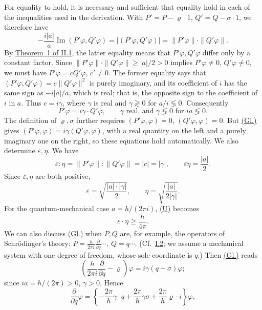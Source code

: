 \documentclass[fontsize=13pt,twoside,openany,headings=normal,parskip=false,bookmarkpackage=false,DIV=calc]{scrbook}
\begin{document}
For equality to hold, it is necessary and sufficient that equality hold in each of the inequalities used in the derivation. With $P'=P-\varrho\cdot1$, $Q'=Q-\sigma\cdot1$, we therefore have
\[
-\frac{i|a|}a\operatorname{Im}(P'\varphi,Q'\varphi)
=|(P'\varphi,Q'\varphi)|=\|P'\varphi\|\cdot\|Q'\varphi\|.
\]
By \hyperref[thm:II.1]{Theorem~1 of II.1}, the latter equality means that $P'\varphi,Q'\varphi$ differ only by a constant factor. Since $\|P'\varphi\|\cdot\|Q'\varphi\|\ge|a|/2>0$ implies $P'\varphi\ne0$, $Q'\varphi\ne0$, we must have $P'\varphi=cQ'\varphi$, $c'\ne0$. The former equality says that $(P'\varphi,Q'\varphi)=c\|Q'\varphi\|^2$ is purely imaginary, and its coefficient of $i$ has the same sign as $-i|a|/a$, which is real; that is, the opposite sign to the coefficient of $i$ in $a$. Thus $c=i\gamma$, where $\gamma$ is real and $\gamma\gtrless0$ for $a/i\lessgtr0$. Consequently
\begin{equation}
P'\varphi=i\gamma\cdot Q'\varphi,\qquad
\gamma\text{ real, and }\gamma\lessgtr0\text{ for }ia\lessgtr0.
\tag{Gl.}\label{eq:III.4.Gl}
\end{equation}
The definition of $\varrho,\sigma$ further requires $(P'\varphi,\varphi)=0$, $(Q'\varphi,\varphi)=0$. But \hyperref[eq:III.4.Gl]{(Gl.)} gives $(P'\varphi,\varphi)=i\gamma(Q'\varphi,\varphi)$, with a real quantity on the left and a purely imaginary one on the right, so these equations hold automatically. We also determine $\varepsilon,\eta$. We have
\[
\varepsilon:\eta=\|P'\varphi\|:\|Q'\varphi\|=|c|=|\gamma|,
\qquad\varepsilon\eta=\frac{|a|}2.
\]
Since $\varepsilon,\eta$ are both positive,
\[
\varepsilon=\sqrt{\frac{|a|\cdot|\gamma|}2},\qquad
\eta=\sqrt{\frac{|a|}{2|\gamma|}}.
\]
For the quantum-mechanical case $a=h/(2\pi i)$, \hyperref[eq:III.4.U]{(U)} becomes
\begin{equation}
\varepsilon\cdot\eta\ge\frac h{4\pi}.\tag{$U'$}\label{eq:III.4.Uprime}
\end{equation}
We can also discuss \hyperref[eq:III.4.Gl]{(Gl.)} when $P,Q$ are, for example, the operators of Schrödinger's theory: $P=\frac h{2\pi i}\frac\partial{\partial q}\cdots$, $Q=q\cdots$. (Cf.\ \hyperref[sec:I.2]{I.2}; we assume a mechanical system with one degree of freedom, whose sole coordinate is $q$.) Then \hyperref[eq:III.4.Gl]{(Gl.)} reads
\[
\left(\frac h{2\pi i}\frac\partial{\partial q}-\varrho\right)\varphi
=i\gamma(q-\sigma)\varphi;
\]
since $ia=h/(2\pi)>0$, $\gamma>0$. Hence
\[
\frac\partial{\partial q}\varphi
=\left\{-\frac{2\pi}h\gamma\cdot q+\frac{2\pi}h\gamma\sigma+\frac{2\pi}h\varrho\cdot i\right\}\varphi,
\]
\end{document}
